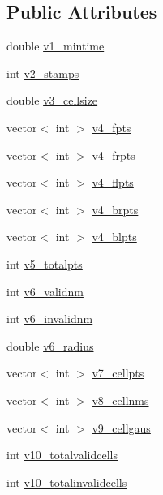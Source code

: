\subsection*{Public Attributes}
\begin{DoxyCompactItemize}
\item 
double \hyperlink{structInfo_a5ef016e8f6dae6e4e76b8908784b3a86}{v1\+\_\+mintime}
\item 
int \hyperlink{structInfo_aa64abd62ad85e8439a08dce95d966016}{v2\+\_\+stamps}
\item 
double \hyperlink{structInfo_a405b01f4335e99a04a75112cb65762e7}{v3\+\_\+cellsize}
\item 
vector$<$ int $>$ \hyperlink{structInfo_a0e526db15dbaf49f82c6b4898e67d771}{v4\+\_\+fpts}
\item 
vector$<$ int $>$ \hyperlink{structInfo_a6f6897c8b36a2cef20f348dc4288f5ce}{v4\+\_\+frpts}
\item 
vector$<$ int $>$ \hyperlink{structInfo_a4562ff86533d50b0abce1d007111040b}{v4\+\_\+flpts}
\item 
vector$<$ int $>$ \hyperlink{structInfo_a7b8fd964aebb52cf8569e30fc19ff4ec}{v4\+\_\+brpts}
\item 
vector$<$ int $>$ \hyperlink{structInfo_ab14116ddeedb6f25e87d23b26beee05c}{v4\+\_\+blpts}
\item 
int \hyperlink{structInfo_af58612e141498fcdffcebd62a80a9415}{v5\+\_\+totalpts}
\item 
int \hyperlink{structInfo_a00a940773f150d742999f3f57bfb3edd}{v6\+\_\+validnm}
\item 
int \hyperlink{structInfo_aa0500491d958efe7c5a2793b205e6f64}{v6\+\_\+invalidnm}
\item 
double \hyperlink{structInfo_a1ed4d11a76b55bbeee5ff08964a70c48}{v6\+\_\+radius}
\item 
vector$<$ int $>$ \hyperlink{structInfo_af0b8abdfd9f9cc34d38eea4f2482d87a}{v7\+\_\+cellpts}
\item 
vector$<$ int $>$ \hyperlink{structInfo_a98320e8f2b02e1ede82716776c01eeeb}{v8\+\_\+cellnms}
\item 
vector$<$ int $>$ \hyperlink{structInfo_a788cd85590e7824770a635228d3528d3}{v9\+\_\+cellgaus}
\item 
int \hyperlink{structInfo_a55e52fabfe4bfc7e4dd0f5ffc26f5f38}{v10\+\_\+totalvalidcells}
\item 
int \hyperlink{structInfo_a8f22dfe0a01d67f48cf29df01bcbbbc6}{v10\+\_\+totalinvalidcells}
\end{DoxyCompactItemize}


